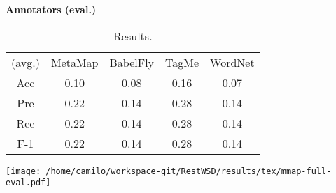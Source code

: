 \begin{center}\textbf{\Large Annotators (eval.)}\end{center}
\begin{center}\begin{table}[p]\centering
\begin{tabular}{ccccc}
(avg.) & MetaMap & BabelFly & TagMe & WordNet\\ 
Acc & 0.10 & 0.08 & 0.16 & 0.07\\ 
Pre & 0.22 & 0.14 & 0.28 & 0.14\\ 
Rec & 0.22 & 0.14 & 0.28 & 0.14\\ 
F-1 & 0.22 & 0.14 & 0.28 & 0.14\\ 

\end{tabular}\caption{Results.}\end{table}\end{center}



\vspace{0.2cm}

\begin{center}
\texttt{[image: /home/camilo/workspace-git/RestWSD/results/tex/mmap-full-eval.pdf]}
\end{center}
\newpage
